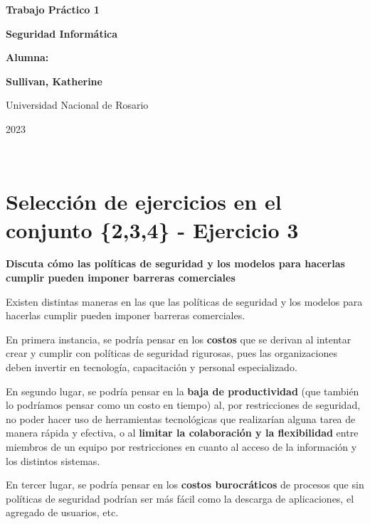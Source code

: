 \documentclass[11pt]{article}
\begin{document}
\begin{titlepage}
    \begin{center}
        \vfill
        \vfill
            \vspace{0.7cm}
            \noindent\textbf{\Huge Trabajo Práctico 1}\par
            \noindent\textbf{\Huge Seguridad Informática}\par
            \vspace{.5cm}
        \vfill
        \noindent \textbf{\huge Alumna:}\par
        \vspace{.5cm}
        \noindent \textbf{\Large Sullivan, Katherine}\par
 
        \vfill
        \large Universidad Nacional de Rosario \par
        \noindent\large 2023
    \end{center}
\end{titlepage}
\ \par



\section*{Selección de ejercicios en el conjunto \{2,3,4\} - Ejercicio 3}

\textbf{Discuta cómo las políticas de seguridad y los modelos para hacerlas cumplir pueden imponer
barreras comerciales}

Existen distintas maneras en las que las políticas de seguridad y los modelos para hacerlas cumplir pueden imponer barreras comerciales. 

En primera instancia, se podría pensar en los \textbf{costos} que se derivan al intentar crear y cumplir con políticas de seguridad rigurosas, pues las organizaciones deben invertir en tecnología, capacitación y personal especializado. 

En segundo lugar, se podría pensar en la \textbf{baja de productividad} (que también lo podríamos pensar como un costo en tiempo) al, por restricciones de seguridad, no poder hacer uso de herramientas tecnológicas que realizarían alguna tarea de manera rápida y efectiva, o al \textbf{limitar la colaboración y la flexibilidad} entre miembros de un equipo por restricciones en cuanto al acceso de la información y los distintos sistemas.

En tercer lugar, se podría pensar en los \textbf{costos burocráticos} de procesos que sin políticas de seguridad podrían ser más fácil como la descarga de aplicaciones, el agregado de usuarios, etc. 
\end{document}
